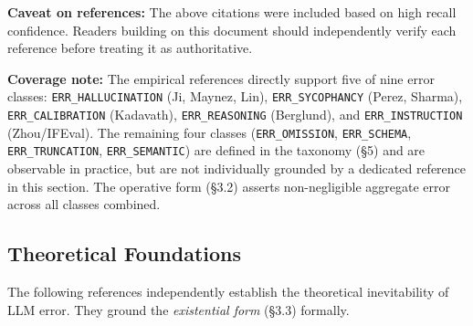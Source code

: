 \documentclass[11pt,a4paper]{article}
\begin{document}
\begin{notebox}
\textbf{Caveat on references:} The above citations were included based on high recall confidence. Readers building on this document should independently verify each reference before treating it as authoritative.
\end{notebox}

\begin{notebox}
\textbf{Coverage note:} The empirical references directly support five of nine error classes: \texttt{ERR\_HALLUCINATION} (Ji, Maynez, Lin), \texttt{ERR\_SYCOPHANCY} (Perez, Sharma), \texttt{ERR\_CALIBRATION} (Kadavath), \texttt{ERR\_REASONING} (Berglund), and \texttt{ERR\_INSTRUCTION} (Zhou/IFEval). The remaining four classes (\texttt{ERR\_OMISSION}, \texttt{ERR\_SCHEMA}, \texttt{ERR\_TRUNCATION}, \texttt{ERR\_SEMANTIC}) are defined in the taxonomy (\S5) and are observable in practice, but are not individually grounded by a dedicated reference in this section. The operative form (\S3.2) asserts non-negligible aggregate error across all classes combined.
\end{notebox}

\subsection{Theoretical Foundations}

The following references independently establish the theoretical inevitability of LLM error. They ground the \emph{existential form} (\S3.3) formally.
\end{document}
